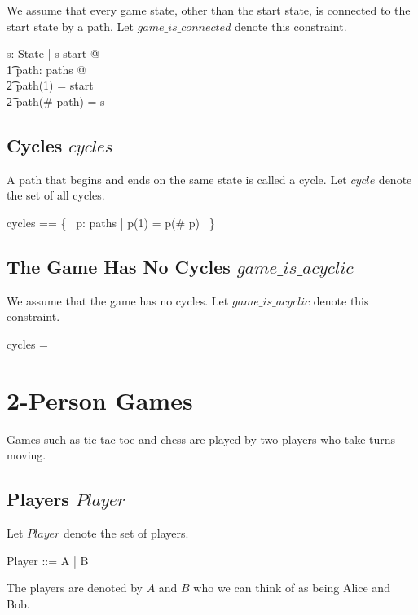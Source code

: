 \documentclass[11pt, oneside]{article}
\begin{document}
We assume that every game state, other than the start state, is connected to the start state
by a path.
Let $game\_is\_connected$ denote this constraint.

\begin{zed}
\forall s: State | s \neq start @ \\
\t1	\exists path: paths @ \\
\t2		path(1) = start \land \\
\t2		path(\# path) = s
\end{zed}

\subsection{Cycles $cycles$}

A path that begins and ends on the same state is called a cycle.
Let $cycle$ denote the set of all cycles.

\begin{zed}
cycles == \{~ p: paths | p(1) = p(\# p) ~\}
\end{zed}

\subsection{The Game Has No Cycles $game\_is\_acyclic$}

We assume that the game has no cycles.
Let $game\_is\_acyclic$ denote this constraint.

\begin{zed}
cycles = \emptyset
\end{zed}

\section{2-Person Games}

Games such as tic-tac-toe and chess are played by two players who take turns moving.

\subsection{Players $Player$}

Let $Player$ denote the set of players.

\begin{zed}
Player ::= A | B
\end{zed}

The players are denoted by $A$ and $B$ who we can think of as being Alice and Bob.
\end{document}
